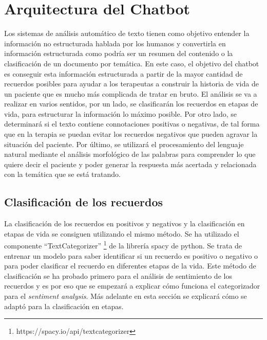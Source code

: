 \chapter{Arquitectura del Chatbot}
\label{cap:arquitectura}

Los sistemas de análisis automático de texto tienen como objetivo entender la información no estructurada hablada por los humanos y convertirla en información estructurada como podría ser un resumen del contenido o la clasificación de un documento por temática. En este caso, el objetivo del chatbot es conseguir esta información estructurada a partir de la mayor cantidad de recuerdos posibles para ayudar a los terapeutas a construir la historia de vida de un paciente que es mucho más complicada de tratar en bruto. El análisis se va a realizar en varios sentidos, por un lado, se clasificarán los recuerdos en etapas de vida, para estructurar la información lo máximo posible. Por otro lado, se determinará si el texto contiene connotaciones positivas o negativas, de tal forma que en la terapia se puedan evitar los recuerdos negativos que pueden agravar la situación del paciente. Por último, se utilizará el procesamiento del lenguaje natural mediante el análisis morfológico de las palabras para comprender lo que quiere decir el paciente y poder generar la respuesta más acertada y relacionada con la temática que se está tratando. 

\section{Clasificación de los recuerdos}

La clasificación de los recuerdos en positivos y negativos y la clasificación en etapas de vida se consiguen utilizando el mismo método. Se ha utilizado el componente ``TextCategorizer'' \footnote{https://spacy.io/api/textcategorizer} de la librería spacy de python. Se trata de entrenar un modelo para saber identificar si un recuerdo es positivo o negativo o para poder clasificar el recuerdo en diferentes etapas de la vida. Este método de clasificación se ha probado primero para el análisis de sentimiento de los recuerdos y es por eso que se empezará a explicar cómo funciona el categorizador para el \textit{sentiment analysis}. Más adelante en esta sección se explicará cómo se adaptó para la clasificación en etapas. 

